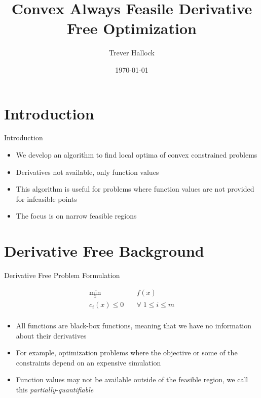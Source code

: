 \documentclass{beamer}
\begin{document}
\title{Convex Always Feasile Derivative Free Optimization}   
\author{Trever Hallock} 
\date{\today} 

\frame{\titlepage} 

\section{Introduction}

\begin{frame}{Introduction}
    \begin{itemize}
        \item We develop an algorithm to find local optima of convex constrained problems
        \item Derivatives not available, only function values
        \item This algorithm is useful for problems where function values are not provided for infeasible points
        \item The focus is on narrow feasible regions
    \end{itemize}
\end{frame}

\section{Derivative Free Background}

\begin{frame}{Derivative Free Problem Formulation}
\begin{center}
\label{Problem}
\begin{align*}
\min_x & \quad f(x) \\
  c_i(x) \le 0   & \quad \forall \; 1 \le i \le m \\
\end{align*}
\end{center}
    \begin{itemize}
        \item All functions are black-box functions, meaning that we have no information about their derivatives
        \item For example, optimization problems where the objective or some of the constraints depend on an expensive simulation
        \item Function values may not be available outside of the feasible region, we call this \emph{partially-quantifiable}
    \end{itemize}
\end{frame}
\end{document}
